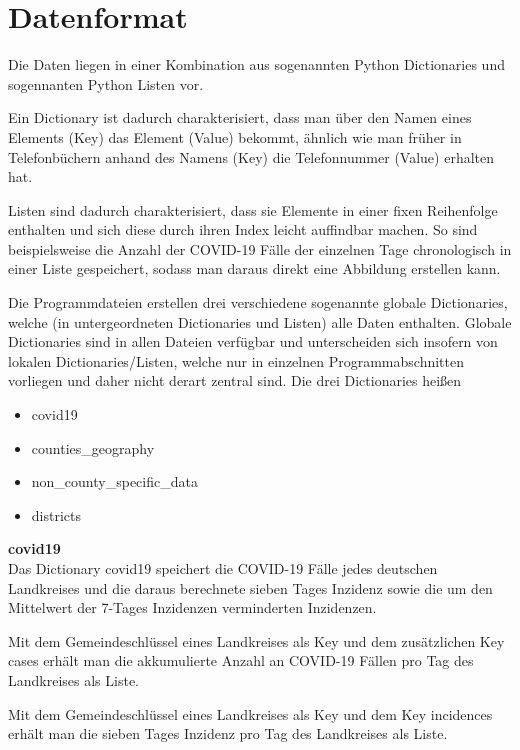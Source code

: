 
\section{Datenformat}
Die Daten liegen in einer Kombination aus sogenannten Python Dictionaries und sogennanten Python Listen vor.

Ein Dictionary ist dadurch charakterisiert, dass man über den Namen eines Elements (\glqq{}Key\grqq{}) das Element (\glqq{}Value\grqq{}) bekommt, ähnlich wie man früher in Telefonbüchern anhand des Namens (Key) die Telefonnummer (Value) erhalten hat.

Listen sind dadurch charakterisiert, dass sie Elemente in einer fixen Reihenfolge enthalten und sich diese durch ihren Index leicht auffindbar machen. So sind beispielsweise die Anzahl der COVID-19 Fälle der einzelnen Tage chronologisch in einer Liste gespeichert, sodass man daraus direkt eine Abbildung erstellen kann.


Die Programmdateien erstellen drei verschiedene sogenannte globale Dictionaries, welche (in untergeordneten Dictionaries und Listen) alle Daten enthalten. Globale Dictionaries sind in allen Dateien verfügbar und unterscheiden sich insofern von lokalen Dictionaries/Listen, welche nur in einzelnen Programmabschnitten vorliegen und daher nicht derart zentral sind.
Die drei Dictionaries heißen
\begin{itemize}
    \item covid19
    \item counties\_geography
    \item non\_county\_specific\_data
    \item districts
\end{itemize}

\textbf{covid19}\\
Das Dictionary covid19 speichert die COVID-19 Fälle jedes deutschen Landkreises und die daraus berechnete sieben Tages Inzidenz sowie die um den Mittelwert der 7-Tages Inzidenzen verminderten Inzidenzen.

Mit dem Gemeindeschlüssel eines Landkreises als Key und dem zusätzlichen Key \glqq{}cases\grqq{} erhält man die akkumulierte Anzahl an COVID-19 Fällen pro Tag des Landkreises als Liste.

Mit dem Gemeindeschlüssel eines Landkreises als Key und dem Key \glqq{}incidences\grqq{} erhält man die sieben Tages Inzidenz pro Tag des Landkreises als Liste.

